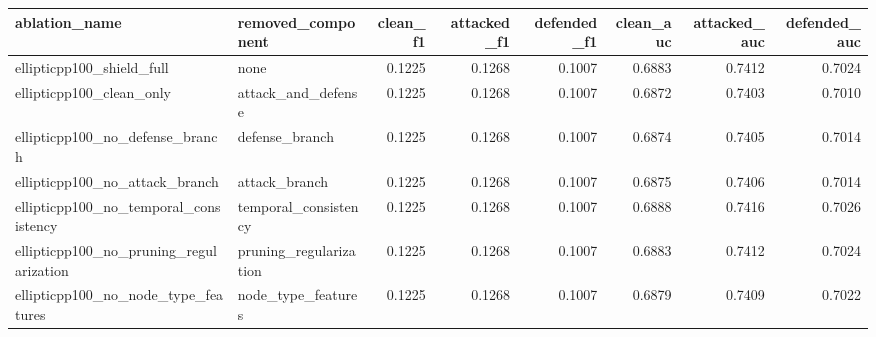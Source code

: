 \begin{tabular}{llrrrrrr}
\toprule
ablation_name & removed_component & clean_f1 & attacked_f1 & defended_f1 & clean_auc & attacked_auc & defended_auc \\
\midrule
ellipticpp100_shield_full & none & 0.1225 & 0.1268 & 0.1007 & 0.6883 & 0.7412 & 0.7024 \\
ellipticpp100_clean_only & attack_and_defense & 0.1225 & 0.1268 & 0.1007 & 0.6872 & 0.7403 & 0.7010 \\
ellipticpp100_no_defense_branch & defense_branch & 0.1225 & 0.1268 & 0.1007 & 0.6874 & 0.7405 & 0.7014 \\
ellipticpp100_no_attack_branch & attack_branch & 0.1225 & 0.1268 & 0.1007 & 0.6875 & 0.7406 & 0.7014 \\
ellipticpp100_no_temporal_consistency & temporal_consistency & 0.1225 & 0.1268 & 0.1007 & 0.6888 & 0.7416 & 0.7026 \\
ellipticpp100_no_pruning_regularization & pruning_regularization & 0.1225 & 0.1268 & 0.1007 & 0.6883 & 0.7412 & 0.7024 \\
ellipticpp100_no_node_type_features & node_type_features & 0.1225 & 0.1268 & 0.1007 & 0.6879 & 0.7409 & 0.7022 \\
\bottomrule
\end{tabular}
